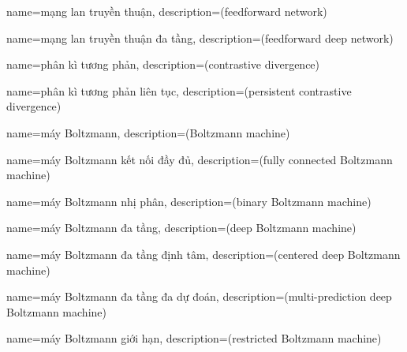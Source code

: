 {
    name={mạng lan truyền thuận},
    description={(feedforward network)}
}

{
    name={mạng lan truyền thuận đa tầng},
    description={(feedforward deep network)}
}

{
    name={phân kì tương phản},
    description={(contrastive divergence)}
}


{
    name={phân kì tương phản liên tục},
    description={(persistent contrastive divergence)}
}



{
    name={máy Boltzmann},
    description={(Boltzmann machine)}
}

{
    name={máy Boltzmann kết nối đầy đủ},
    description={(fully connected Boltzmann machine)}
}

{
    name={máy Boltzmann nhị phân},
    description={(binary Boltzmann machine)}
}

{
    name={máy Boltzmann đa tầng},
    description={(deep Boltzmann machine)}
}


{
    name={máy Boltzmann đa tầng định tâm},
    description={(centered deep Boltzmann machine)}
}

{
    name={máy Boltzmann đa tầng đa dự đoán},
    description={(multi-prediction deep Boltzmann machine)}
}


{
    name={máy Boltzmann giới hạn},
    description={(restricted Boltzmann machine)}
}




